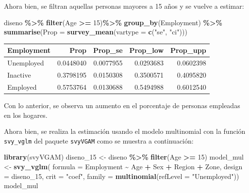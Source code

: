 \documentclass[
  spanish,
  12pt,
]{book}
\newenvironment{Shaded}{\begin{snugshade}}{\end{snugshade}}
\newcommand{\AttributeTok}[1]{\textcolor[rgb]{0.13,0.29,0.53}{#1}}
\newcommand{\DecValTok}[1]{\textcolor[rgb]{0.00,0.00,0.81}{#1}}
\newcommand{\FunctionTok}[1]{\textcolor[rgb]{0.13,0.29,0.53}{\textbf{#1}}}
\newcommand{\NormalTok}[1]{#1}
\newcommand{\OtherTok}[1]{\textcolor[rgb]{0.56,0.35,0.01}{#1}}
\newcommand{\SpecialCharTok}[1]{\textcolor[rgb]{0.81,0.36,0.00}{\textbf{#1}}}
\newcommand{\StringTok}[1]{\textcolor[rgb]{0.31,0.60,0.02}{#1}}
\begin{document}
Ahora bien, se filtran aquellas personas mayores a 15 años y se vuelve a estimar:

\begin{Shaded}
\begin{Highlighting}[]
\NormalTok{diseno }\SpecialCharTok{\%\textgreater{}\%} \FunctionTok{filter}\NormalTok{(Age }\SpecialCharTok{\textgreater{}=} \DecValTok{15}\NormalTok{)}\SpecialCharTok{\%\textgreater{}\%} \FunctionTok{group\_by}\NormalTok{(Employment) }\SpecialCharTok{\%\textgreater{}\%} 
  \FunctionTok{summarise}\NormalTok{(}\AttributeTok{Prop =} \FunctionTok{survey\_mean}\NormalTok{(}\AttributeTok{vartype =} \FunctionTok{c}\NormalTok{(}\StringTok{"se"}\NormalTok{, }\StringTok{"ci"}\NormalTok{)))}
\end{Highlighting}
\end{Shaded}

\begin{tabular}{l|r|r|r|r}
\hline
Employment & Prop & Prop\_se & Prop\_low & Prop\_upp\\
\hline
Unemployed & 0.0448040 & 0.0077955 & 0.0293683 & 0.0602398\\
\hline
Inactive & 0.3798195 & 0.0150308 & 0.3500571 & 0.4095820\\
\hline
Employed & 0.5753764 & 0.0130688 & 0.5494988 & 0.6012540\\
\hline
\end{tabular}

Con lo anterior, se observa un aumento en el porcentaje de personas empleadas en los hogares.

Ahora bien, se realiza la estimación usando el modelo multinomial con la función \texttt{svy\_vglm} del paquete \texttt{svyVGAM} como se muestra a continuación:

\begin{Shaded}
\begin{Highlighting}[]
\FunctionTok{library}\NormalTok{(svyVGAM)}
\NormalTok{diseno\_15 }\OtherTok{\textless{}{-}}\NormalTok{ diseno }\SpecialCharTok{\%\textgreater{}\%} \FunctionTok{filter}\NormalTok{(Age }\SpecialCharTok{\textgreater{}=} \DecValTok{15}\NormalTok{)}
\NormalTok{model\_mul }\OtherTok{\textless{}{-}} \FunctionTok{svy\_vglm}\NormalTok{(}
    \AttributeTok{formula =}\NormalTok{ Employment }\SpecialCharTok{\textasciitilde{}}\NormalTok{ Age }\SpecialCharTok{+}\NormalTok{ Sex }\SpecialCharTok{+}\NormalTok{ Region }\SpecialCharTok{+}\NormalTok{ Zone,}
                   \AttributeTok{design =}\NormalTok{ diseno\_15, }
     \AttributeTok{crit =} \StringTok{"coef"}\NormalTok{,}
    \AttributeTok{family =} \FunctionTok{multinomial}\NormalTok{(}\AttributeTok{refLevel =} \StringTok{"Unemployed"}\NormalTok{))}
\NormalTok{model\_mul}
\end{Highlighting}
\end{Shaded}
\end{document}
